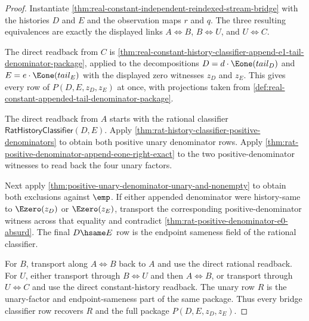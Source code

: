 \begin{proof}
Instantiate \autoref{thm:real-constant-independent-reindexed-stream-bridge}
with the histories $D$ and $E$ and the observation maps $r$ and $q$. The three
resulting equivalences are exactly the displayed links $A\Longleftrightarrow B$,
$B\Longleftrightarrow U$, and $U\Longleftrightarrow C$.

The direct readback from $C$ is
\autoref{thm:real-constant-history-classifier-append-e1-tail-denominator-package},
applied to the decompositions $D=d\cdot\Eone(tail_D)$ and
$E=e\cdot\Eone(tail_E)$ with the displayed zero witnesses $z_D$ and $z_E$.
This gives every row of $P(D,E,z_D,z_E)$ at once, with projections taken from
\autoref{def:real-constant-appended-tail-denominator-package}.

The direct readback from $A$ starts with the rational classifier
$\mathsf{RatHistoryClassifier}(D,E)$. Apply
\autoref{thm:rat-history-classifier-positive-denominators} to obtain both
positive unary denominator rows. Apply
\autoref{thm:rat-positive-denominator-append-eone-right-exact} to the two
positive-denominator witnesses to read back the four unary factors.

Next apply
\autoref{thm:positive-unary-denominator-unary-and-nonempty} to obtain both
exclusions against $\emp$. If either appended denominator were
history-same to $\Ezero(z_D)$ or $\Ezero(z_E)$, transport the corresponding
positive-denominator witness across that equality and contradict
\autoref{thm:rat-positive-denominator-e0-absurd}. The final $D\hsame E$ row is
the endpoint sameness field of the rational classifier.

For $B$, transport along $A\Longleftrightarrow B$ back to $A$ and use the
direct rational readback. For $U$, either transport through
$B\Longleftrightarrow U$ and then $A\Longleftrightarrow B$, or transport
through $U\Longleftrightarrow C$ and use the direct constant-history readback.
The unary row $R$ is the unary-factor and endpoint-sameness part of the same
package. Thus every bridge classifier row recovers $R$ and the full package
$P(D,E,z_D,z_E)$.
\end{proof}
